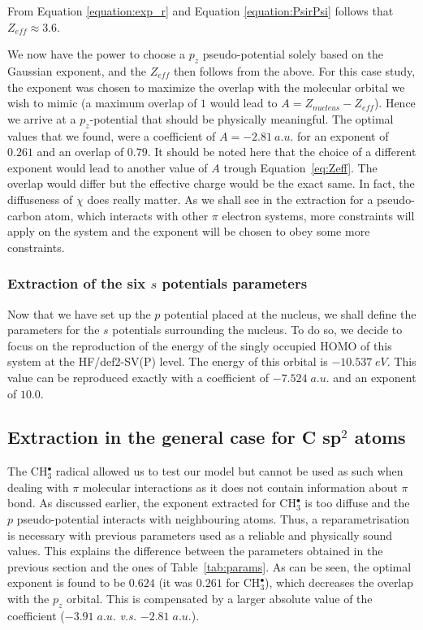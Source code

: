 \documentclass[aip]{revtex4-1}
\begin{document}
From Equation \ref{equation:exp_r} and Equation \ref{equation:PsirPsi} follows
that \(Z_{eff} \approx 3.6\). 

We now have the power to choose a \(p_{z}\) pseudo-potential solely based on the Gaussian
exponent, and the \(Z_{eff}\) then follows from the above.
For this case study, 
the exponent was chosen to maximize the overlap with the molecular
orbital we wish to mimic (a maximum overlap of $1$ would lead to
$A=Z_{nucleus}-Z_{eff}$).
Hence we arrive at a \(p_{z}\)-potential that should be physically meaningful. 
The optimal values that we found,
were a coefficient of $A=-2.81 \ a.u.$ for 
an exponent of $0.261$ and an overlap of $0.79$. 
It should be noted here that the choice of a different exponent would lead to another value
of $A$ trough Equation~\ref{eq:Zeff}.
The overlap would differ but the effective charge would be the exact same.
In fact, the diffuseness of $\chi$ does really matter.
As we shall see in the extraction for a pseudo-carbon atom, which interacts with other
$\pi$ electron systems, more constraints will apply on the system and the exponent
will be chosen to obey some more constraints.

\subsubsection{Extraction of the six $s$ potentials parameters}
Now that we have set up the $p$ potential placed at the nucleus, we shall define
the parameters for the $s$ potentials surrounding the nucleus.
To do so, we decide to focus on the reproduction of the energy of the singly
occupied HOMO of this system
at the HF/def2-SV(P) level. The energy of this orbital is $-10.537\;eV$.
This value can be reproduced exactly with a coefficient of $-7.524\;a.u.$
and an exponent of $10.0$.

\subsection{Extraction in the general case for C sp$^2$ atoms}
\label{section:csp2_extraction}
The CH$_3^\bullet$ radical allowed us to test our model but cannot be used
as such when dealing with $\pi$ molecular interactions as it does not contain
information about $\pi$ bond.
As discussed earlier, the exponent extracted for CH$_3^\bullet$ is too diffuse
and the $p$ pseudo-potential interacts with neighbouring atoms.
Thus, a reparametrisation is necessary with previous parameters used as a reliable
and physically sound values.
This explains the difference between the parameters obtained in the previous
section and the ones of Table~\ref{tab:params}.
As can be seen, the optimal exponent is found to be $0.624$ (it was $0.261$ for
CH$_3^\bullet$), which decreases the overlap with the $p_z$ orbital.
This is compensated by a larger absolute value of the coefficient ($-3.91\;a.u.$ \textsl{v.s.} $-2.81\;a.u.$).
\end{document}
